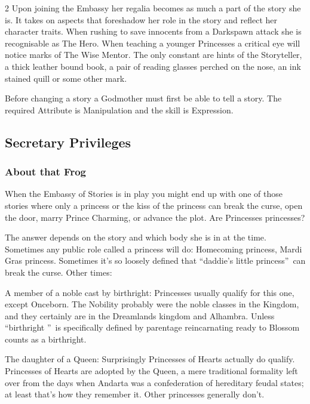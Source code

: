 \begin{multicols}{2}
Upon joining the Embassy her regalia becomes as much a part of the story she is. It takes on aspects that foreshadow her role in the story and reflect her character traits. When rushing to save innocents from a Darkspawn attack she is recognisable as The Hero. When teaching a younger Princesses a critical eye will notice marks of The Wise Mentor. The only constant are hints of the Storyteller, a thick leather bound book, a pair of reading glasses perched on the nose, an ink stained quill or some other mark.

Before changing a story a Godmother must first be able to tell a story. The required Attribute is Manipulation and the skill is Expression. 
\subsection*{Secretary Privileges}


\begin{mybox}

\subsubsection*{About that Frog}

When the Embassy of Stories is in play you might end up with one of those stories where only a princess or the kiss of the princess can break the curse, open the door, marry Prince Charming, or advance the plot. Are Princesses princesses? 



The answer depends on the story and which body she is in at the time. Sometimes any public role called a princess will do: Homecoming princess, Mardi Gras princess. Sometimes it's so loosely defined that \textquotedblleft daddie's little princess\textquotedblright\, can break the curse. Other times:



A member of a noble cast by birthright: Princesses usually qualify for this one, except Onceborn. The Nobility probably were the noble classes in the Kingdom, and they certainly are in the Dreamlands kingdom and Alhambra. Unless \textquotedblleft birthright \textquotedblright\, is specifically defined by parentage reincarnating ready to Blossom counts as a birthright. 



The daughter of a Queen: Surprisingly Princesses of Hearts actually do qualify. Princesses of Hearts are adopted by the Queen, a mere traditional formality left over from the days when Andarta was a confederation of hereditary feudal states; at least that's how they remember it. Other princesses generally don't. 




\end{mybox}
\end{multicols}
